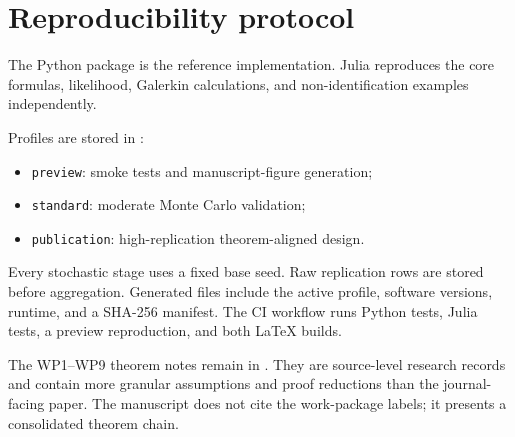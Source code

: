 \section{Reproducibility protocol}

The Python package is the reference implementation. Julia reproduces the core formulas, likelihood, Galerkin calculations, and non-identification examples independently.

Profiles are stored in :
\begin{itemize}
\item \texttt{preview}: smoke tests and manuscript-figure generation;
\item \texttt{standard}: moderate Monte Carlo validation;
\item \texttt{publication}: high-replication theorem-aligned design.
\end{itemize}

Every stochastic stage uses a fixed base seed. Raw replication rows are stored before aggregation. Generated files include the active profile, software versions, runtime, and a SHA-256 manifest. The CI workflow runs Python tests, Julia tests, a preview reproduction, and both LaTeX builds.

The WP1--WP9 theorem notes remain in . They are source-level research records and contain more granular assumptions and proof reductions than the journal-facing paper. The manuscript does not cite the work-package labels; it presents a consolidated theorem chain.
